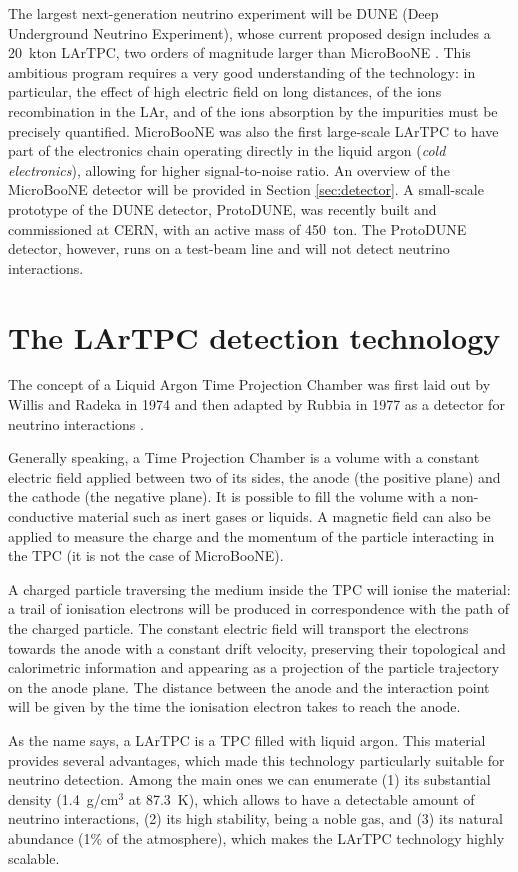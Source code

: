 The largest next-generation neutrino experiment will be DUNE (Deep Underground Neutrino Experiment), whose current proposed design includes a 20~kton LArTPC, two orders of magnitude larger than MicroBooNE \cite{Acciarri:2016ooe}. This ambitious program requires a very good understanding of the technology: in particular, the effect of high electric field on long distances, of the ions recombination in the LAr, and of the ions absorption by the impurities must be precisely quantified. 
MicroBooNE was also the first large-scale LArTPC to have part of the electronics chain operating directly in the liquid argon (\emph{cold electronics}), allowing for higher signal-to-noise ratio. An overview of the MicroBooNE detector will be provided in Section \ref{sec:detector}.
A small-scale prototype of the DUNE detector, ProtoDUNE, was recently built and commissioned at CERN, with an active mass of 450~ton. The ProtoDUNE detector, however, runs on a test-beam line and will not detect neutrino interactions.

\section{The LArTPC detection technology}
The concept of a Liquid Argon Time Projection Chamber was first laid out by Willis and Radeka in 1974 \cite{Willis:1974gi} and then adapted by Rubbia in 1977 as a detector for neutrino interactions \cite{Rubbia:1977zz}. 

Generally speaking, a Time Projection Chamber is a volume with a constant electric field applied between two of its sides, the anode (the positive plane) and the cathode (the negative plane). It is possible to fill the volume with a non-conductive material such as inert gases or liquids. A magnetic field can also be applied to measure the charge and the momentum of the particle interacting in the TPC (it is not the case of MicroBooNE). 

A charged particle traversing the medium inside the TPC will ionise the material: a trail of ionisation electrons will be produced in correspondence with the path of the charged particle. The constant electric field will transport the electrons towards the anode with a constant drift velocity, preserving their topological and calorimetric information and appearing as a projection of the particle trajectory on the anode plane. The distance between the anode and the interaction point will be given by the time the ionisation electron takes to reach the anode.

As the name says, a LArTPC is a TPC filled with liquid argon. This material provides several advantages, which made this technology particularly suitable for neutrino detection. Among the main ones we can enumerate (1) its substantial density (1.4~g/cm$^3$ at 87.3~K), which allows to have a detectable amount of neutrino interactions, (2) its high stability, being a noble gas, and (3) its natural abundance (1\% of the atmosphere), which makes the LArTPC technology highly scalable.

